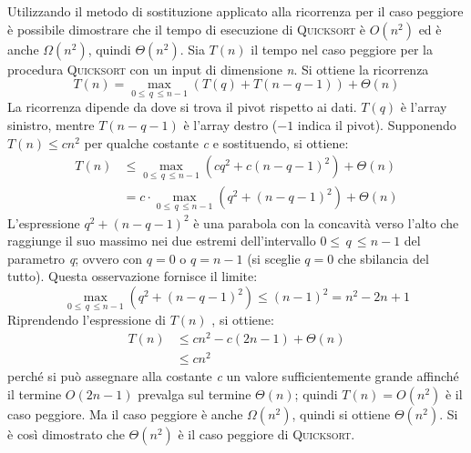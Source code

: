 \documentclass[10pt, a4paper]{report}
\begin{document}
Utilizzando il metodo di sostituzione applicato alla ricorrenza per il caso peggiore è possibile dimostrare che il tempo di esecuzione di \textsc{Quicksort} è $O(n^2)$ ed è anche $\Omega(n^2)$, quindi $\Theta(n^2)$. Sia $T(n)$ il tempo nel caso peggiore per la procedura \textsc{Quicksort} con un input di dimensione \textit{n}. Si ottiene la ricorrenza
\begin{equation*}
T(n) = \max_{0 \leq \,q\, \leq n-1} (T(q) + T(n - q - 1)) + \Theta(n)
\end{equation*}
La ricorrenza dipende da dove si trova il pivot rispetto ai dati. $T(q)$ è l'array sinistro, mentre $T(n - q -1)$ è l'array destro ($-1$ indica il pivot). Supponendo $T(n) \leq cn^2$ per qualche costante \textit{c} e sostituendo, si ottiene:
\begin{align*}
T(n) &\leq \max_{0 \leq \,q\, \leq n-1} (cq^2 + c(n - q - 1)^2) + \Theta(n) \\
&= c \cdot \max_{0 \leq \,q\, \leq n-1} (q^2 + (n - q - 1)^2) + \Theta(n)
\end{align*}
L'espressione $q^2 + (n - q - 1)^2$ è una parabola  con la concavità verso l'alto che raggiunge il suo massimo nei due estremi dell'intervallo $0 \leq \,q\, \leq n-1$ del parametro \textit{q}; ovvero con $q = 0$ o $q = n - 1$ (si sceglie $q  = 0$ che sbilancia del tutto). Questa osservazione fornisce il limite:
\begin{equation*}
\max_{0 \leq \,q\, \leq n-1} (q^2 + (n - q - 1)^2) \leq (n - 1)^2 = n^2 - 2n + 1
\end{equation*}
Riprendendo l'espressione di $T(n)$ , si ottiene:
\begin{align*}
T(n) &\leq cn^2 - c(2n - 1) + \Theta(n) \\
&\leq cn^2
\end{align*}
perché si può assegnare alla costante \textit{c} un valore sufficientemente grande affinché il termine $O(2n - 1)$ prevalga sul termine $\Theta(n)$; quindi $T(n) = O(n^2)$ è il caso peggiore. Ma il caso peggiore è anche $\Omega(n^2)$, quindi si ottiene $\Theta(n^2)$. Si è così dimostrato che $\Theta(n^2)$ è il caso peggiore di \textsc{Quicksort}.
\end{document}
